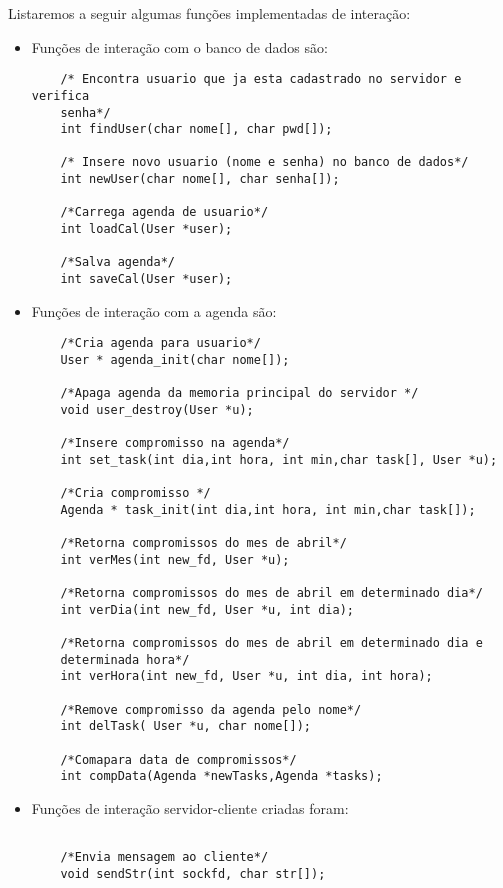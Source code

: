 \documentclass[10pt,a4paper]{article}
\begin{document}
Listaremos a seguir algumas funções implementadas de interação:
\begin{itemize}
\item  Funções de interação com o banco de dados são:
  \begin{lstlisting}
    /* Encontra usuario que ja esta cadastrado no servidor e verifica
    senha*/
    int findUser(char nome[], char pwd[]);
    
    /* Insere novo usuario (nome e senha) no banco de dados*/
    int newUser(char nome[], char senha[]);
    
    /*Carrega agenda de usuario*/
    int loadCal(User *user);
    
    /*Salva agenda*/
    int saveCal(User *user);
  \end{lstlisting}

\item Funções de interação com a agenda  são:

  \begin{lstlisting}
    /*Cria agenda para usuario*/
    User * agenda_init(char nome[]);

    /*Apaga agenda da memoria principal do servidor */
    void user_destroy(User *u);

    /*Insere compromisso na agenda*/
    int set_task(int dia,int hora, int min,char task[], User *u);

    /*Cria compromisso */
    Agenda * task_init(int dia,int hora, int min,char task[]);

    /*Retorna compromissos do mes de abril*/
    int verMes(int new_fd, User *u);

    /*Retorna compromissos do mes de abril em determinado dia*/
    int verDia(int new_fd, User *u, int dia);
    
    /*Retorna compromissos do mes de abril em determinado dia e
    determinada hora*/
    int verHora(int new_fd, User *u, int dia, int hora);

    /*Remove compromisso da agenda pelo nome*/
    int delTask( User *u, char nome[]);

    /*Comapara data de compromissos*/
    int compData(Agenda *newTasks,Agenda *tasks);

  \end{lstlisting}

\item Funções de interação servidor-cliente criadas foram:
  \begin{lstlisting}

    /*Envia mensagem ao cliente*/
    void sendStr(int sockfd, char str[]);


\end{lstlisting}
\end{itemize}
\end{document}
